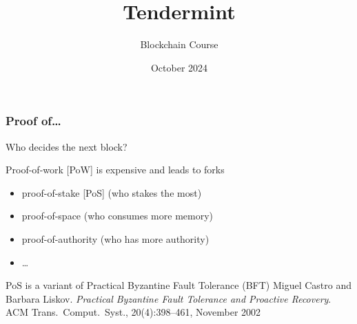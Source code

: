 \documentclass[11pt]{beamer}  %
\subtitle{Blockchain Course}
\title{Tendermint}
\institute{Universit\`a di Verona, Italy}
\date{October 2024}
\begin{document}
\begin{frame}
  \titlepage
\end{frame}

\begin{frame}
  \frametitle{Proof of\ldots}

  \begin{center}
    Who decides the next block?
  \end{center}

  \bigskip

  \begin{greenbox}{Proof-of-work [PoW] is expensive and leads to forks}
    \begin{itemize}
    \item proof-of-stake [PoS] (who stakes the most)
    \item proof-of-space (who consumes more memory)
    \item proof-of-authority (who has more authority)
    \item \ldots
    \end{itemize}
  \end{greenbox}

  \bigskip

  \begin{greenbox}{PoS is a variant of Practical Byzantine Fault Tolerance (BFT)}
    Miguel Castro and Barbara Liskov.
    \emph{Practical Byzantine Fault Tolerance and Proactive Recovery}.
    ACM Trans.\ Comput.\ Syst., 20(4):398–461, November 2002
  \end{greenbox}

\end{frame}
\end{document}
